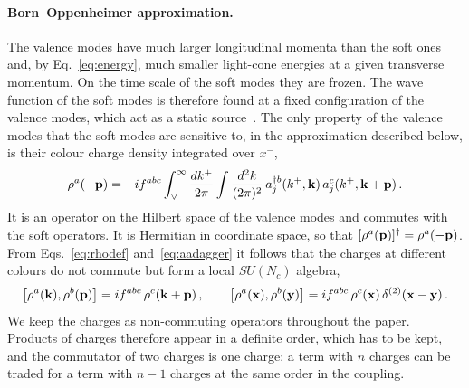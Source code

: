 \paragraph{Born--Oppenheimer approximation.} The valence modes have much larger longitudinal momenta than the soft ones and, by Eq.~\eqref{eq:energy}, much smaller light-cone energies at a given transverse momentum. On the time scale of the soft modes they are frozen. The wave function of the soft modes is therefore found at a fixed configuration of the valence modes, which act as a static source~\cite{Kovner:2005en,Lublinsky:2016meo}. The only property of the valence modes that the soft modes are sensitive to, in the approximation described below, is their colour charge density integrated over $x^-$,
\begin{align}\label{eq:rhodef}
\rho^a(-\mathbf{p})=-if^{abc}\int_\vee^\infty\frac{dk^+}{2\pi}\int\frac{d^2k}{(2\pi)^2}\,a^{\dagger b}_j(k^+,\mathbf{k})\,a^c_j(k^+,\mathbf{k}+\mathbf{p})\,.
\end{align}
It is an operator on the Hilbert space of the valence modes and commutes with the soft operators. It is Hermitian in coordinate space, so that $[\rho^a(\mathbf{p})]^\dagger=\rho^a(-\mathbf{p})$. From Eqs.~\eqref{eq:rhodef} and~\eqref{eq:aadagger} it follows that the charges at different colours do not commute but form a local $SU(N_c)$ algebra,
\begin{align}\label{eq:rhoalgebra}
\big[\rho^a(\mathbf{k}),\rho^b(\mathbf{p})\big]=if^{abc}\,\rho^c(\mathbf{k}+\mathbf{p})\,,\qquad
\big[\rho^a(\mathbf{x}),\rho^b(\mathbf{y})\big]=if^{abc}\,\rho^c(\mathbf{x})\,\delta^{(2)}(\mathbf{x}-\mathbf{y})\,.
\end{align}
We keep the charges as non-commuting operators throughout the paper. Products of charges therefore appear in a definite order, which has to be kept, and the commutator of two charges is one charge: a term with $n$ charges can be traded for a term with $n-1$ charges at the same order in the coupling.

